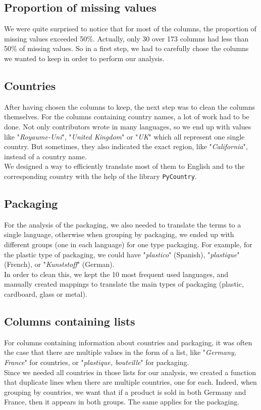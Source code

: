 \documentclass[11pt]{article}
\begin{document}
\subsection{Proportion of missing values}
We were quite surprised to notice that for most of the columns, the proportion of missing values exceeded 50\%. Actually, only 30 over 173 columns had less than 50\% of missing values. So in a first step, we had to carefully chose the columns we wanted to keep in order to perform our analysis.

\subsection{Countries}
After having chosen the columns to keep, the next step was to clean the columns themselves. For the columns containing country names, a lot of work had to be done. Not only contributors wrote in many languages, so we end up with values like "\textit{Royaume-Uni}", "\textit{United Kingdom}" or "\textit{UK}" which all represent one single country. But sometimes, they also indicated the exact region, like "\textit{California}", instead of a country name.\\ 
We designed a way to efficiently translate most of them to English and to the corresponding country with the help of the library \texttt{PyCountry}.

\subsection{Packaging}
For the analysis of the packaging, we also needed to translate the terms to a single language, otherwise when grouping by packaging, we ended up with different groups (one in each language) for one type packaging. For example, for the plastic type of packaging, we could have "\textit{plastico}" (Spanish), "\textit{plastique}" (French), or "\textit{Kunststoff}" (German).\\
In order to clean this, we kept the 10 most frequent used languages, and manually created mappings to translate the main types of packaging (plastic, cardboard, glass or metal).

\subsection{Columns containing lists}
For columns containing information about countries and packaging, it was often the case that there are multiple values in the form of a list, like "\textit{Germany, France}" for countries, or "\textit{plastique, bouteille}" for packaging.\\
Since we needed all countries in those lists for our analysis, we created a function that duplicate lines when there are multiple countries, one for each. Indeed, when grouping by countries, we want that if a product is sold in both Germany and France, then it appears in both groups. The same applies for the packaging.
\end{document}
